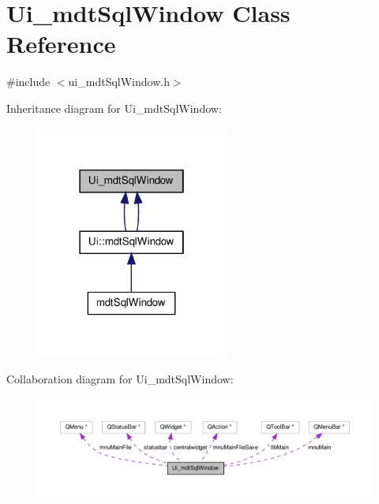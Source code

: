 \hypertarget{class_ui__mdt_sql_window}{\section{Ui\-\_\-mdt\-Sql\-Window Class Reference}
\label{class_ui__mdt_sql_window}
}


{\ttfamily \#include $<$ui\-\_\-mdt\-Sql\-Window.\-h$>$}



Inheritance diagram for Ui\-\_\-mdt\-Sql\-Window\-:
\nopagebreak
\begin{figure}[H]
\begin{center}
\leavevmode
\includegraphics[width=178pt]{class_ui__mdt_sql_window__inherit__graph}
\end{center}
\end{figure}


Collaboration diagram for Ui\-\_\-mdt\-Sql\-Window\-:
\nopagebreak
\begin{figure}[H]
\begin{center}
\leavevmode
\includegraphics[width=350pt]{class_ui__mdt_sql_window__coll__graph}
\end{center}
\end{figure}
